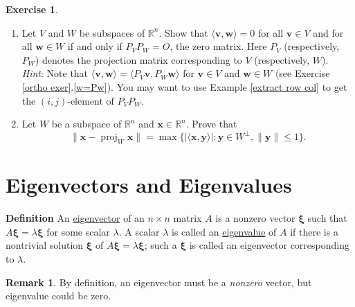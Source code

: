 \documentclass[12pt,letterpaper]{book}
\numberwithin{equation}{section}
\theoremstyle{definition}
\newtheorem{remark}[thm]{\textbf{Remark}}
\newtheorem{exercise}{\textbf{Exercise}}[chapter]
\newcommand{\vv}{\bm{v}}
\newcommand{\vw}{\bm{w}}
\newcommand{\vx}{\bm{x}}
\newcommand{\vy}{\bm{y}}
\newcommand{\vxi}{\bm{\xi}}
\begin{document}
\begin{exercise}
\begin{enumerate}[\bfseries 1.]
\item Let $V$ and $W$ be subspaces of $\mathbb{R}^n$. Show that $\langle \vv, \vw\rangle=0$ for all $\vv\in V$ and for all $\vw\in W$ if and only if $P_{V}P_{W}=O$, the zero matrix. Here $P_V$ (respectively, $P_W$) denotes the projection matrix corresponding to $V$ (respectively, $W$). \\
\textit{Hint}: Note that $\langle \vv, \vw\rangle=\langle P_V\vv, P_W\vw\rangle$ for $\vv\in V$ and $\vw\in W$ (see Exercise \ref{ortho exer}.\ref{w=Pw}). You may want to use Example \ref{extract row col} to get the $(i,j)$-element of $P_{V}P_{W}$.

\item Let $W$ be a subspace of $\mathbb{R}^n$ and $\vx\in \mathbb{R}^n$. Prove that
$$\|\vx-\operatorname{proj}_W \vx\|=\max\{|\langle \vx,\vy\rangle|: \vy \in W^\perp, \|\vy\|\leq 1 \}.$$

\end{enumerate}
\end{exercise}

\section{Eigenvectors and Eigenvalues}

\textbf{Definition} An \underline{eigenvector} of an $n\times n$
matrix $A$ is a nonzero vector $\vxi$ such that $A\vxi=\lambda \vxi$
for some scalar $\lambda$. A scalar $\lambda$ is called an
\underline{eigenvalue} of $A$ if there is a nontrivial solution
$\vxi$ of $A \vxi=\lambda \vxi$; such a $\vxi$ is called an
eigenvector corresponding to $\lambda$.

\begin{remark} By definition, an eigenvector must be a \textit{nonzero} vector, but eigenvalue could be zero.
\end{remark}
\end{document}
